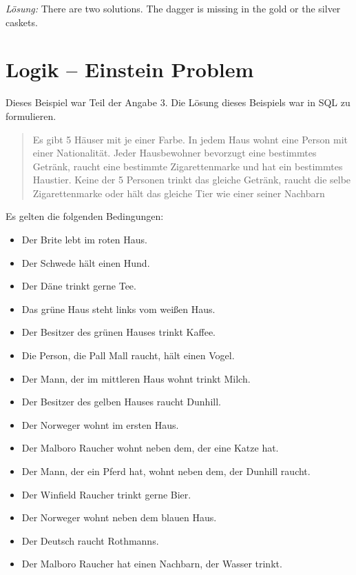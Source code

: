 \documentclass[11pt,a4paper]{article}
\theoremstyle{area}
\begin{document}
\emph{Lösung:} There are two solutions. The dagger is missing in the
    gold or the silver caskets.

\section{Logik -- Einstein Problem}

Dieses Beispiel war Teil der Angabe 3. Die Lösung dieses Beispiels war
in SQL zu formulieren.

\begin{quote}
  Es gibt 5 Häuser mit je einer Farbe. In jedem Haus wohnt eine Person
  mit einer Nationalität. Jeder Hausbewohner bevorzugt eine
  bestimmtes Getränk, raucht eine bestimmte Zigarettenmarke und hat ein
  bestimmtes Haustier. Keine der 5 Personen trinkt das gleiche Getränk,
  raucht die selbe Zigarettenmarke oder hält das gleiche Tier wie
  einer seiner Nachbarn
\end{quote}

Es gelten die folgenden Bedingungen:

\begin{itemize}
  \item Der Brite lebt im roten Haus.
  \item Der Schwede hält einen Hund.
  \item Der Däne trinkt gerne Tee.
  \item Das grüne Haus steht links vom weißen Haus.
  \item Der Besitzer des grünen Hauses trinkt Kaffee.
  \item Die Person, die Pall Mall raucht, hält einen Vogel.
  \item Der Mann, der im mittleren Haus wohnt trinkt Milch.
  \item Der Besitzer des gelben Hauses raucht Dunhill.
  \item Der Norweger wohnt im ersten Haus.
  \item Der Malboro Raucher wohnt neben dem, der eine Katze hat.
  \item Der Mann, der ein Pferd hat, wohnt neben dem, der Dunhill raucht.
  \item Der Winfield Raucher trinkt gerne Bier.
  \item Der Norweger wohnt neben dem blauen Haus.
  \item Der Deutsch raucht Rothmanns.
  \item Der Malboro Raucher hat einen Nachbarn, der Wasser trinkt.
\end{itemize}
\end{document}
